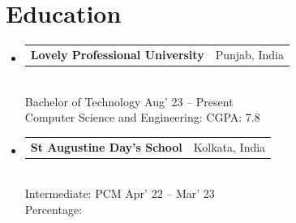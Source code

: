 \documentclass[10pt, a4paper]{article}
\makeatletter
\newcommand{\instituterow}[2]{%
  \noindent\begin{tabularx}{\linewidth}{@{}X@{\hspace{4pt}}r@{}}
    {\color{headingblue}\bfseries\fontsize{10pt}{12pt}\selectfont #1} &
    {\fontsize{8.5pt}{10pt}\selectfont #2}
  \end{tabularx}%
}
\makeatother
\begin{document}
\section{Education}
\vspace{4pt}
\begin{itemize}[itemsep=8pt]

  \item
    \instituterow{Lovely Professional University}{Punjab, India}\\[1pt]
    {\fontsize{8.5pt}{10pt}\selectfont Bachelor of Technology \hfill Aug' 23 -- Present}\\
    {\fontsize{8.5pt}{10pt}\selectfont Computer Science and Engineering: CGPA: 7.8}

  \item
    \instituterow{St Augustine Day's School}{Kolkata, India}\\[1pt]
    {\fontsize{8.5pt}{10pt}\selectfont Intermediate: PCM \hfill Apr' 22 -- Mar' 23}\\
    {\fontsize{8.5pt}{10pt}\selectfont Percentage:}

\end{itemize}
\end{document}
